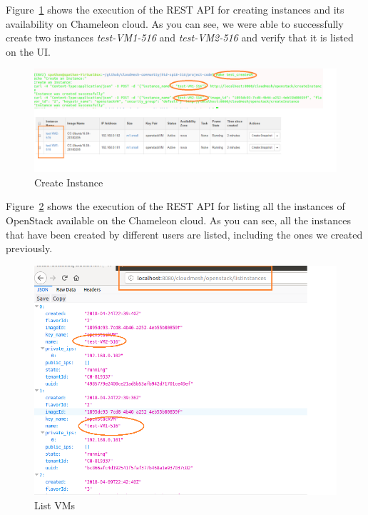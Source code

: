 Figure~\ref{fig:createVM} shows the execution of the REST API for creating
instances and its availability on Chameleon cloud. As you can see, we were
able to successfully create two instances \textit{test-VM1-516} and 
\textit{test-VM2-516} and verify that it is listed on the UI.

\begin{figure}[!ht]
        \centering\includegraphics[width=\columnwidth]{images/createVM.png}
        \caption{Create Instance}\label{fig:createVM}
\end{figure}

Figure~\ref{fig:listVM} shows the execution of the REST API for listing all 
the instances of OpenStack available on the Chameleon cloud. As you can see, 
all the instances that have been created by different users are listed, 
including the ones we created previously. 

\begin{figure}[!ht]
        \centering\includegraphics[width=\columnwidth]{images/listVMs.png}
        \caption{List VMs}\label{fig:listVM}
\end{figure}


